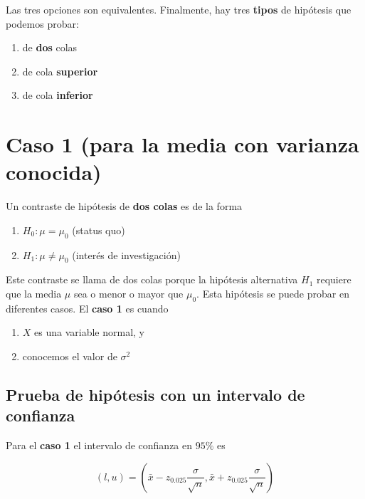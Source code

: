 \documentclass[
]{book}
\providecommand{\tightlist}{%
  \setlength{\itemsep}{0pt}\setlength{\parskip}{0pt}}
\begin{document}
Las tres opciones son equivalentes. Finalmente, hay tres \textbf{tipos} de hipótesis que podemos probar:

\begin{enumerate}
\def\labelenumi{\arabic{enumi}.}
\tightlist
\item
  de \textbf{dos} colas
\item
  de cola \textbf{superior}
\item
  de cola \textbf{inferior}
\end{enumerate}

\hypertarget{caso-1-para-la-media-con-varianza-conocida}{%
\section{Caso 1 (para la media con varianza conocida)}\label{caso-1-para-la-media-con-varianza-conocida}}

Un contraste de hipótesis de \textbf{dos colas} es de la forma

\begin{enumerate}
\def\labelenumi{\alph{enumi}.}
\tightlist
\item
  \(H_0:\mu = \mu_0\) (status quo)
\item
  \(H_1:\mu \neq \mu_0\) (interés de investigación)
\end{enumerate}

Este contraste se llama de dos colas porque la hipótesis alternativa \(H_1\) requiere que la media \(\mu\) sea o menor o mayor que \(\mu_0\). Esta hipótesis se puede probar en diferentes casos. El \textbf{caso 1} es cuando

\begin{enumerate}
\def\labelenumi{\arabic{enumi}.}
\tightlist
\item
  \(X\) es una variable normal, y
\item
  conocemos el valor de \(\sigma^2\)
\end{enumerate}

\hypertarget{prueba-de-hipuxf3tesis-con-un-intervalo-de-confianza}{%
\subsection{Prueba de hipótesis con un intervalo de confianza}\label{prueba-de-hipuxf3tesis-con-un-intervalo-de-confianza}}

Para el \textbf{caso 1} el intervalo de confianza en \(95\%\) es

\[(l,u)=(\bar{x}-z_{0.025} \frac{\sigma}{\sqrt{n}}, \bar{x}+z_{0.025} \frac{\sigma}{ \sqrt{n}})\]
\end{document}
